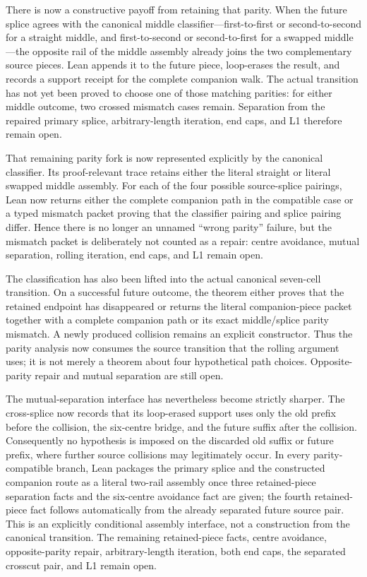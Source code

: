 \documentclass[11pt]{article}
\theoremstyle{definition}
\begin{document}
There is now a constructive payoff from retaining that parity.  When the
future splice agrees with the canonical middle classifier---first-to-first or
second-to-second for a straight middle, and first-to-second or second-to-first
for a swapped middle---the opposite rail of the middle assembly already joins
the two complementary source pieces.  Lean appends it to the future piece,
loop-erases the result, and records a support receipt for the complete
companion walk.  The actual transition has not yet been proved to choose one
of those matching parities: for either middle outcome, two crossed mismatch
cases remain.  Separation from the repaired primary splice, arbitrary-length
iteration, end caps, and L1 therefore remain open.

That remaining parity fork is now represented explicitly by the canonical
classifier.  Its proof-relevant trace retains either the literal straight or
literal swapped middle assembly.  For each of the four possible source-splice
pairings, Lean now returns either the complete companion path in the compatible
case or a typed mismatch packet proving that the classifier pairing and splice
pairing differ.  Hence there is no longer an unnamed ``wrong parity'' failure,
but the mismatch packet is deliberately not counted as a repair: centre
avoidance, mutual separation, rolling iteration, end caps, and L1 remain open.

The classification has also been lifted into the actual canonical seven-cell
transition.  On a successful future outcome, the theorem either proves that
the retained endpoint has disappeared or returns the literal companion-piece
packet together with a complete companion path or its exact middle/splice
parity mismatch.  A newly produced collision remains an explicit constructor.
Thus the parity analysis now consumes the source transition that the rolling
argument uses; it is not merely a theorem about four hypothetical path
choices.  Opposite-parity repair and mutual separation are still open.

The mutual-separation interface has nevertheless become strictly sharper.
The cross-splice now records that its loop-erased support uses only the old
prefix before the collision, the six-centre bridge, and the future suffix
after the collision.  Consequently no hypothesis is imposed on the discarded
old suffix or future prefix, where further source collisions may legitimately
occur.  In every parity-compatible branch, Lean packages the primary splice
and the constructed companion route as a literal two-rail assembly once three
retained-piece separation facts and the six-centre avoidance fact are given;
the fourth retained-piece fact follows automatically from the already
separated future source pair.  This is an explicitly conditional assembly
interface, not a construction from the canonical transition.  The remaining
retained-piece facts, centre avoidance, opposite-parity repair,
arbitrary-length iteration, both end caps, the separated crosscut pair, and
L1 remain open.
\end{document}
